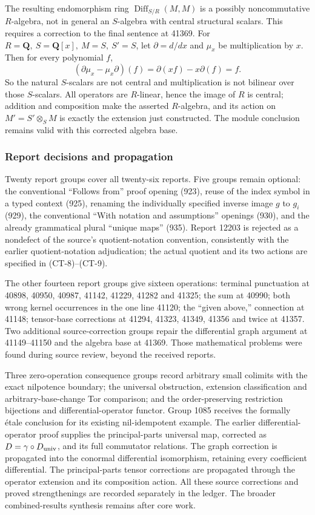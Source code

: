 The resulting endomorphism ring \(\operatorname{Diff}_{S/R}(M,M)\) is a possibly noncommutative \(R\)-algebra, not in general an \(S\)-algebra with central structural scalars. This requires a correction to the final sentence at 41369. For \(R=\mathbf Q,\ S=\mathbf Q[x],\ M=S,\ S'=S\), let \(\partial=d/dx\) and \(\mu_x\) be multiplication by \(x\). Then for every polynomial \(f\), \[
(\partial\mu_x-\mu_x\partial)(f)
 =\partial(xf)-x\partial(f)=f.
\] So the natural \(S\)-scalars are not central and multiplication is not bilinear over those \(S\)-scalars. All operators are \(R\)-linear, hence the image of \(R\) is central; addition and composition make the asserted \(R\)-algebra, and its action on \(M'=S'\otimes_SM\) is exactly the extension just constructed. The module conclusion remains valid with this corrected algebra base.

\subsubsection{Report decisions and propagation}\label{algebra-proof-055-report-decisions-and-propagation}

Twenty report groups cover all twenty-six reports. Five groups remain optional: the conventional ``Follows from'' proof opening (923), reuse of the index symbol in a typed context (925), renaming the individually specified inverse image \(g\) to \(g_i\) (929), the conventional ``With notation and assumptions'' openings (930), and the already grammatical plural ``unique maps'' (935). Report 12203 is rejected as a nondefect of the source's quotient-notation convention, consistently with the earlier quotient-notation adjudication; the actual quotient and its two actions are specified in (CT-8)--(CT-9).

The other fourteen report groups give sixteen operations: terminal punctuation at 40898, 40950, 40987, 41142, 41229, 41282 and 41325; the sum at 40990; both wrong kernel occurrences in the one line 41120; the ``given above,'' connection at 41148; tensor-base corrections at 41294, 41323, 41349, 41356 and twice at 41357. Two additional source-correction groups repair the differential graph argument at 41149--41150 and the algebra base at 41369. Those mathematical problems were found during source review, beyond the received reports.

Three zero-operation consequence groups record arbitrary small colimits with the exact nilpotence boundary; the universal obstruction, extension classification and arbitrary-base-change Tor comparison; and the order-preserving restriction bijections and differential-operator functor. Group 1085 receives the formally étale conclusion for its existing nil-idempotent example. The earlier differential-operator proof supplies the principal-parts universal map, corrected as \(D=\gamma\circ D_{\rm univ}\), and its full commutator relations. The graph correction is propagated into the conormal differential isomorphism, retaining every coefficient differential. The principal-parts tensor corrections are propagated through the operator extension and its composition action. All these source corrections and proved strengthenings are recorded separately in the ledger. The broader combined-results synthesis remains after core work.
